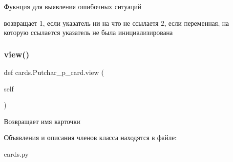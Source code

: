 Фукнция для выявления ошибочных ситуаций 

возвращает 1, если указатель ни на что не ссылаетя 2, если переменная, на которую ссылается указатель не была инициализирована \mbox{\label{classcards_1_1_putchar__p__card_a9dbb824fdf07cf99b6a08cccf4b946ae}} 
\subsubsection{\texorpdfstring{view()}{view()}}
{\footnotesize\ttfamily def cards.\+Putchar\+\_\+p\+\_\+card.\+view (\begin{DoxyParamCaption}\item[{}]{self }\end{DoxyParamCaption})}



Возвращает имя карточки 



Объявления и описания членов класса находятся в файле\+:\begin{DoxyCompactItemize}
\item 
cards.\+py\end{DoxyCompactItemize}
